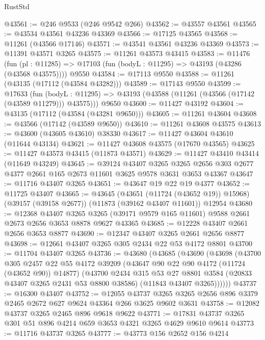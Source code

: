 \begin{lexlean}{RustStd}
\begin{coremodule}
@43561 := @246 @9533 (@246 @9542 @266)
@43562 := @43557 @43561
@43565 := @43534 @43561 @43236 @43369
@43566 := @17125 @43565
@43568 := @11261 (@43566 @17146)
@43571 := @43541 @43561 @43236 @43369
@43573 := @11391 @43571 @3265
@43575 := @11261 @43573 @43415
@43583 := @11476
    (fun (pl : @11285) => @17103 (fun (bodyL : @11295) => @43193 (@43286 (@43568 @43575))))
    @9550
@43584 := @17113 @9550
@43588 := @11261 (@43135 (@17112 (@43584 @43282)))
@43589 := @17143 @9550
@43599 := @17633
    (fun (bodyL : @11295) => @43193 (@43588 (@11261 (@43566 (@17142 (@43589 @11279))) @43575)))
    @9650
@43600 := @11427 @43192
@43604 := @43135 (@17112 (@43584 (@43281 @9650)))
@43605 := @11261 @43604
@43608 := @43566 (@17142 (@43589 @9650))
@43610 := @11261 @43608 @43575
@43613 := @43600 (@43605 @43610) @38330
@43617 := @11427 @43604 @43610 (@11644 @43134)
@43621 := @11427 @43608 @43575 (@17670 @43565)
@43625 := @11427 @43573 @43415 (@11873 @43571)
@43629 := @11427 @43410 @43414 (@11649 @43249)
@43645 := @39124
    @43407
    @3265
    @3265
    @2656
    @303
    @2677
    @4377
    @2661
    @165
    @2673
    @11601
    @3625
    @9578
    @3631
    @3653
    @43367
@43647 := @11716 @43407 @3265
@43651 := @43647 @19 @22 @19 @4377
@43652 := @11725 @43407
@43665 := @43645
    (@43651 (@11724 (@43652 @19)) @15968)
    (@39157 (@39158 @2677))
    (@11873 (@39162 @43407 @11601))
    @12954
@43680 := @12368
    @43407
    @3265
    @3265
    (@39171 @9579 @165 @11601)
    @9588
    @2661
    @2673
    @2656
    @3653
    @8878
    @9627
    @43365
@43685 := @12228 @43407 @2661 @2656 @3653 @8877
@43690 := @12347 @43407 @3265 @2661 @2656 @8877
@43698 := @12661 @43407 @3265 @305 @2434 @22 @53 @4172 @8801
@43700 := @11704 @43407 @3265
@43736 := @43680
    (@43685
      (@43690
        (@43698
          (@43700
            @305
            @2457
            @22
            @55
            @4172
            @39209
            (@43647 @90 @22 @90 @4172 (@11724 (@43652 @90)) @14877)
            (@43700
              @2434
              @315
              @53
              @27
              @8801
              @3584
              (@20833 @43407 @3265 @2431 @53 @8800 @38586)
              (@11843 @43407 @3265))))))
@43737 := @16300 @43407
@43752 := @12055
    @43737
    @3265
    @3265
    @2656
    @896
    @3379
    @2465
    @2672
    @627
    @9624
    @43364
    @266
    @3625
    @9602
    @3631
@43758 := @12082 @43737 @3265 @2465 @896 @9618 @9622
@43771 := @17831 @43737 @3265 @301 @51 @896 @4214 @659 @3653 @4321 @3265 @4629 @9610 @9614
@43773 := @11716 @43737 @3265
@43777 := @43773 @156 @2652 @156 @4214

\end{coremodule}
\end{lexlean}

